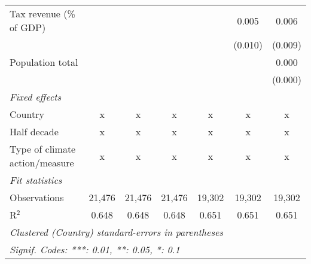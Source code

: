 \begin{tabular}{lcccccc}
   Tax revenue (\% of GDP)                                      &              &                &                &               & 0.005         & 0.006\\   
                                                                &              &                &                &               & (0.010)       & (0.009)\\   
   Population total                                             &              &                &                &               &               & 0.000\\   
                                                                &              &                &                &               &               & (0.000)\\   
   \emph{Fixed effects}\\
   Country                                                      & x            & x              & x              & x             & x             & x\\  
   Half decade                                                  & x            & x              & x              & x             & x             & x\\  
   Type of climate action/measure                               & x            & x              & x              & x             & x             & x\\  
   \midrule \emph{Fit statistics}\\
   Observations                                                 & 21,476       & 21,476         & 21,476         & 19,302        & 19,302        & 19,302\\  
   R$^2$                                                        & 0.648        & 0.648          & 0.648          & 0.651         & 0.651         & 0.651\\  
   \midrule
   \multicolumn{7}{l}{\emph{Clustered (Country) standard-errors in parentheses}}\\
   \multicolumn{7}{l}{\emph{Signif. Codes: ***: 0.01, **: 0.05, *: 0.1}}\\
\end{tabular}
\par\endgroup


